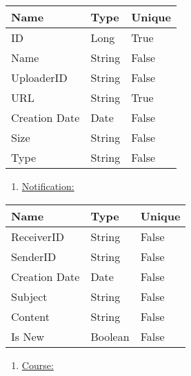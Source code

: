 \documentclass[12pt,a4paper]{article}
\begin{document}
    \begin{table}[h]
        \centering
        \begin{tabular}{|l|l|l|}
            \hline
            \textbf{Name} & \textbf{Type} & \textbf{Unique} \\
            \hline
            ID & Long & True \\
            \hline
            Name & String & False \\
            \hline
            UploaderID & String & False \\
            \hline
            URL & String & True \\
            \hline
            Creation Date & Date & False \\
            \hline
            Size & String & False \\
            \hline
            Type & String & False \\
            \hline
        \end{tabular}
    \end{table}


    \begin{enumerate}
        \setcounter{enumi}{\thenumberedCntBA}
        \item \underline{Notification:}
        \setcounter{numberedCntBA}{\theenumi}
    \end{enumerate}
    \begin{table}[h]
        \centering
        \begin{tabular}{|l|l|l|}
            \hline
            \textbf{Name} & \textbf{Type} & \textbf{Unique} \\
            \hline
            ReceiverID & String & False \\
            \hline
            SenderID & String & False \\
            \hline
            Creation Date & Date & False \\
            \hline
            Subject & String & False \\
            \hline
            Content & String & False \\
            \hline
            Is New & Boolean & False \\
            \hline
        \end{tabular}
    \end{table}


    \begin{enumerate}
        \setcounter{enumi}{\thenumberedCntBA}
        \item \underline{Course:}
        \setcounter{numberedCntBA}{\theenumi}
    \end{enumerate}
\end{document}
